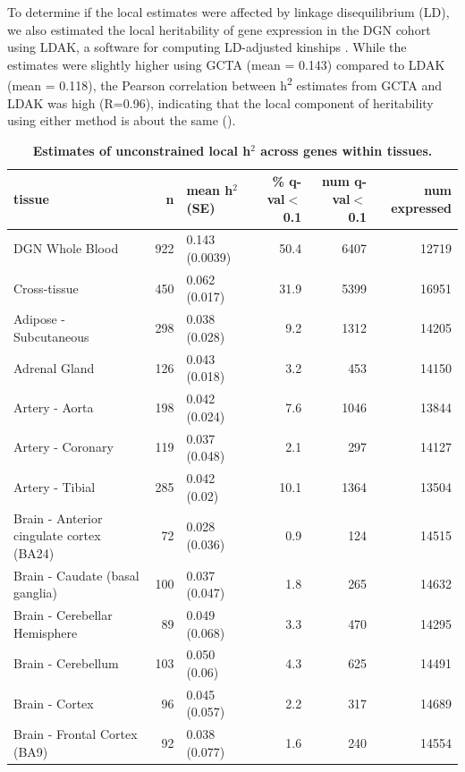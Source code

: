 \documentclass[10pt,letterpaper]{article}
\begin{document}
To determine if the local estimates were affected by linkage disequilibrium (LD), we also estimated the local heritability of gene expression in the DGN cohort using LDAK, a software for computing LD-adjusted kinships \cite{speed2012improved}. While the estimates were slightly higher using GCTA (mean = 0.143) compared to LDAK (mean = 0.118), the Pearson correlation between h\textsuperscript{2} estimates from GCTA and LDAK was high (R=0.96), indicating that the local component of heritability using either method is about the same ().

\begin{table}[!ht]
\begin{adjustwidth}{-2.25in}{0in} %
\caption{
{\bf Estimates of unconstrained local h$^2$ across genes within tissues.}}
\begin{tabular}{lrlrrr}
 \hline
tissue & n & mean h$^2$ (SE) & \% q-val$<$0.1 & num q-val$<$0.1 & num expressed \\ 
  \hline
DGN Whole Blood & 922 & 0.143 (0.0039) & 50.4 & 6407 & 12719 \\ 
  Cross-tissue & 450 & 0.062 (0.017) & 31.9 & 5399 & 16951 \\ 
  Adipose - Subcutaneous & 298 & 0.038 (0.028) & 9.2 & 1312 & 14205 \\ 
  Adrenal Gland & 126 & 0.043 (0.018) & 3.2 & 453 & 14150 \\ 
  Artery - Aorta & 198 & 0.042 (0.024) & 7.6 & 1046 & 13844 \\ 
  Artery - Coronary & 119 & 0.037 (0.048) & 2.1 & 297 & 14127 \\ 
  Artery - Tibial & 285 & 0.042 (0.02) & 10.1 & 1364 & 13504 \\ 
  Brain - Anterior cingulate cortex (BA24) & 72 & 0.028 (0.036) & 0.9 & 124 & 14515 \\ 
  Brain - Caudate (basal ganglia) & 100 & 0.037 (0.047) & 1.8 & 265 & 14632 \\ 
  Brain - Cerebellar Hemisphere & 89 & 0.049 (0.068) & 3.3 & 470 & 14295 \\ 
  Brain - Cerebellum & 103 & 0.050 (0.06) & 4.3 & 625 & 14491 \\ 
  Brain - Cortex & 96 & 0.045 (0.057) & 2.2 & 317 & 14689 \\ 
  Brain - Frontal Cortex (BA9) & 92 & 0.038 (0.077) & 1.6 & 240 & 14554 \\ 

\end{tabular}
\end{adjustwidth}
\end{table}
\end{document}
